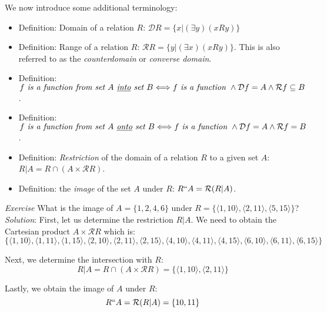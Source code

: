 We now introduce some additional terminology:

\begin{itemize}
\item Definition: Domain of a relation $R$: $\mathcal{D}R=\{x | (\exists y) (x R y) \}$
\item Definition: Range of a relation $R$: $\mathcal{R}R=\{y | (\exists x) (x R y) \}$.  This is also referred to as the \textit{counterdomain} or \textit{converse domain}.
\item Definition: $f \textit{ is a function from set }A \textit{ \underline{into} set } B \Longleftrightarrow f \textit{ is a function } \land \mathcal{D}f=A \land \mathcal{R}f \subseteq B$.
\item Definition: $f \textit{ is a function from set }A \textit{ \underline{onto} set } B \Longleftrightarrow f \textit{ is a function } \land \mathcal{D}f=A \land \mathcal{R}f = B$.
\item Definition: \textit{Restriction} of the domain of a relation $R$ to a given set $A$: $R|A = R \cap (A \times \mathcal{R} R)$.
\item Definition: the \textit{image} of the set $A$ under $R$: $R``A = \mathcal{R} (R|A)$.
\end{itemize}

\textit{Exercise} What is the image of $A=\{1,2,4,6\}$ under $R=\{\langle1,10 \rangle, \langle 2,11 \rangle, \langle 5,15 \rangle\}$?\\

\textit{Solution}:  First, let us determine the restriction $R|A$.  We need to obtain the Cartesian product $A \times \mathcal{R} R$ which is:\\
\begin{displaymath}
 \{\langle1,10 \rangle, \langle1,11 \rangle, \langle1,15 \rangle, \langle2,10 \rangle, \langle 2,11\rangle, \langle2,15 \rangle, \langle4,10 \rangle, \langle 4,11\rangle, \langle4,15 \rangle, \langle6,10 \rangle, \langle 6,11\rangle, \langle6,15 \rangle\}
 \end{displaymath}
 
 Next, we determine the intersection with $R$:
 \begin{displaymath}
 R|A = R \cap (A \times \mathcal{R} R) = \{\langle1,10 \rangle,  \langle 2,11\rangle \}
 \end{displaymath}
 
 Lastly, we obtain the image of $A$ under $R$:
  \begin{displaymath}
 R``A = \mathcal{R} (R|A)=\{10,11\}
  \end{displaymath}

